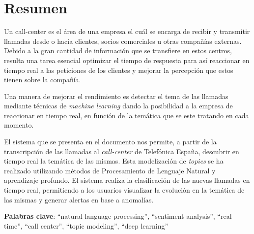 




\chapter*{Resumen}


Un call-center es el área de una empresa el cuál se encarga de recibir y transmitir llamadas desde o hacia clientes, socios comerciales u otras compañías externas. Debido a la gran cantidad de información que se transfiere en estos centros, resulta una tarea esencial optimizar el tiempo de respuesta para así reaccionar en tiempo real a las peticiones de los clientes y mejorar la percepción que estos tienen sobre la compañía. 

Una manera de mejorar el rendimiento es detectar el tema de las llamadas  mediante técnicas de \textit{machine learning} dando la posibilidad a la empresa de reaccionar en tiempo real, en función de la temática que se este tratando en cada momento. 




El sistema que se presenta en el documento nos permite, a partir de la transcripción de las llamadas al \textit{call-center} de Telefónica España, descubrir en tiempo real la temática de las mismas. Esta modelización de \textit{topics} se ha realizado utilizando métodos de Procesamiento de Lenguaje Natural y aprendizaje profundo. El sistema realiza la clasificación de las nuevas llamadas en tiempo real, permitiendo a los usuarios visualizar la evolución en la temática de las mismas y generar alertas en base a anomalías.  


\onehalfspacing

\vspace{1.5cm}

\textbf{Palabras clave}: ``natural language processing'', ``sentiment analysis'', ``real time'', ``call center'', ``topic modeling'', ``deep learning''